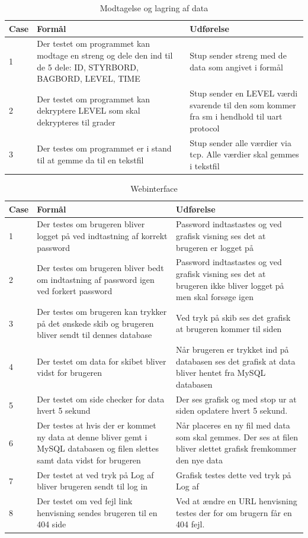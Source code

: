 \begin{table}[H]
\caption{Modtagelse og lagring af data}
\centering
\begin{tabular}{| p{1cm}  | p{4.5cm} | p{8cm} |}
\hline
Case &Formål &Udførelse\\\hline
1 &Der testet om programmet kan modtage en streng og dele den ind til de 5 dele: ID, STYRBORD, BAGBORD, LEVEL, TIME &Stup sender streng med de data som angivet i formål\\\hline
2 &Der testet om programmet kan dekryptere LEVEL som skal dekrypteres til grader &Stup sender en LEVEL værdi svarende til den som kommer fra sm i hendhold til uart protocol\\\hline
3 &Der testes om programmet er i stand til at gemme da til en tekstfil &Stup sender alle værdier via tcp. Alle værdier skal gemmes i tekstfil\\\hline
\end{tabular}
\end{table}
\begin{table}[H]
\caption{Webinterface}
\centering
\begin{tabular}{| p{1cm}  | p{4.5cm} | p{8cm} |}
\hline
Case &Formål &Udførelse\\\hline
1 &Der testes om brugeren bliver logget på ved indtastning af korrekt password&Password indtastastes og ved grafisk visning ses det at brugeren er logget på\\\hline
2 &Der testes om brugeren bliver bedt om indtastning af password igen ved forkert password&Password indtastastes og ved grafisk visning ses det at brugeren ikke bliver logget på men skal forsøge igen\\\hline
3 &Der testes om brugeren kan trykker på det ønskede skib og brugeren bliver sendt til dennes database& Ved tryk på skib ses det grafisk at brugeren kommer til siden\\\hline
4 &Der testet om data for skibet bliver vidst for brugeren& Når brugeren er trykket ind på databasen ses det grafisk at data bliver hentet fra MySQL databasen\\\hline
5 &Der testet om side checker for data hvert 5 sekund& Der ses grafisk og med stop ur at siden opdatere hvert 5 sekund.\\\hline
6 &Der testes at hvis der er kommet ny data at denne bliver gemt i MySQL databasen og filen slettes samt data vidst for brugeren& Når placeres en ny fil med data som skal gemmes. Der ses at filen bliver slettet grafisk fremkommer den nye data\\\hline
7 &Der testet at ved tryk på Log af bliver brugeren sendt til log in & Grafisk testes dette ved tryk på Log af\\\hline
8 &Der testet om ved fejl link henvisning sendes brugeren til en 404 side & Ved at ændre en URL henvisning testes der for om brugern får en 404 fejl.\\\hline
\end{tabular}
\end{table}



